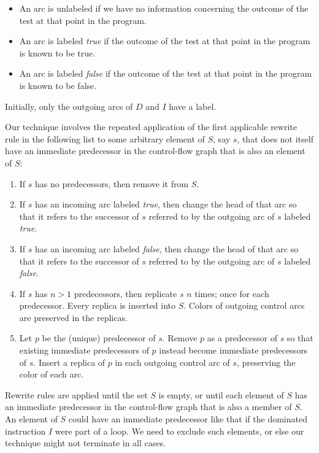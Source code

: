 \begin{itemize}
\item An arc is unlabeled if we have no information concerning the
  outcome of the test at that point in the program.
\item An arc is labeled \emph{true} if the outcome of the test at that
  point in the program is known to be true.
\item An arc is labeled \emph{false} if the outcome of the test at
  that point in the program is known to be false.
\end{itemize}

Initially, only the outgoing arcs of $D$ and $I$ have a label.

Our technique involves the repeated application of the first
applicable rewrite rule in the following list to some arbitrary
element of $S$, say $s$, that does not itself have an immediate
predecessor in the control-flow graph that is also an element of $S$:

\begin{enumerate}
\item If $s$ has no predecessors, then remove it from $S$.
\item If $s$ has an incoming arc labeled \emph{true}, then change the
  head of that arc so that it refers to the successor of $s$ referred
  to by the outgoing arc of $s$ labeled \emph{true}.
\item If $s$ has an incoming arc labeled \emph{false}, then change the
  head of that arc so that it refers to the successor of $s$ referred
  to by the outgoing arc of $s$ labeled \emph{false}.
\item If $s$ has $n>1$ predecessors, then replicate $s$ $n$ times;
  once for each predecessor.  Every replica is inserted into $S$.
  Colors of outgoing control arcs are preserved in the replicas.
\item Let $p$ be the (unique) predecessor of $s$.  Remove $p$ as a
  predecessor of $s$ so that existing immediate predecessors of $p$
  instead become immediate predecessors of $s$.  Insert a replica of
  $p$ in each outgoing control arc of $s$, preserving the color of
  each arc.
\end{enumerate}

\noindent
Rewrite rules are applied until the set $S$ is empty, or until each
element of $S$ has an immediate predecessor in the control-flow graph
that is also a member of $S$.  An element of $S$ could have an
immediate predecessor like that if the dominated instruction $I$ were
part of a loop.  We need to exclude such elements, or else our
technique might not terminate in all cases.


